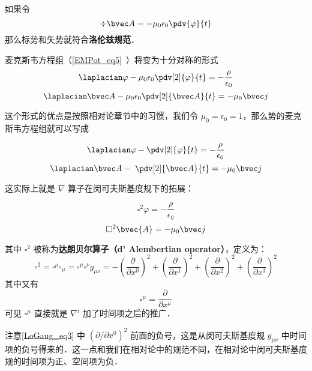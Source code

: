
\begin{issues}
\issueDraft
\end{issues}


如果令
\begin{equation}
\div \bvec A = -\mu_0 \epsilon_0 \pdv{\varphi}{t}
\end{equation}
那么标势和矢势就符合\textbf{洛伦兹规范}． 

麦克斯韦方程组（\autoref{EMPot_eq5}~）将变为十分对称的形式
\begin{equation}\label{LoGaug_eq1}
\laplacian \varphi - \mu_0\epsilon_0 \pdv[2]{\varphi}{t} = -\frac{\rho}{\epsilon_0}
\end{equation}
\begin{equation}\label{LoGaug_eq2}
\laplacian \bvec A - \mu_0\epsilon_0 \pdv[2]{\bvec A}{t} = -\mu_0 \bvec j
\end{equation}

这个形式的优点是按照相对论章节中的习惯，我们令 $\mu_0=\epsilon_0=1$，那么势的麦克斯韦方程组就可以写成

\begin{equation}
\laplacian \varphi -  \pdv[2]{\varphi}{t} = -\frac{\rho}{\epsilon_0}
\end{equation}
\begin{equation}
\laplacian \bvec A - \ \pdv[2]{\bvec A}{t} = -\mu_0 \bvec j
\end{equation}

这实际上就是 $\nabla$ 算子在闵可夫斯基度规下的拓展：

\begin{equation}
\square^2 \varphi = -\frac{\rho}{\epsilon_0}
\end{equation}
\begin{equation}
\square^2 \bvec{A} = -\mu_0 \bvec j
\end{equation}

其中 $\square^2$ 被称为\textbf{达朗贝尔算子（d' Alembertian operator）}，定义为：
\begin{equation}\label{LoGaug_eq3}
\square^2=\square^\mu\square_\mu=\square^\mu\square^\nu g_{\mu\nu}=-(\frac{\partial}{\partial x^0})^2+(\frac{\partial}{\partial x^1})^2+(\frac{\partial}{\partial x^2})^2+(\frac{\partial}{\partial x^3})^2
\end{equation}
其中又有
\begin{equation}
\square^\mu=\frac{\partial}{\partial x^\mu}
\end{equation}
可见 $\square^\mu$ 直接就是 $\nabla^i$ 加了时间项之后的推广．

注意\autoref{LoGaug_eq3} 中 $(\partial/\partial x^0)^2$ 前面的负号，这是从闵可夫斯基度规 $g_{\mu\nu}$ 中时间项的负号得来的．这一点和我们在相对论中的规范不同，在相对论中闵可夫斯基度规的时间项为正、空间项为负．





